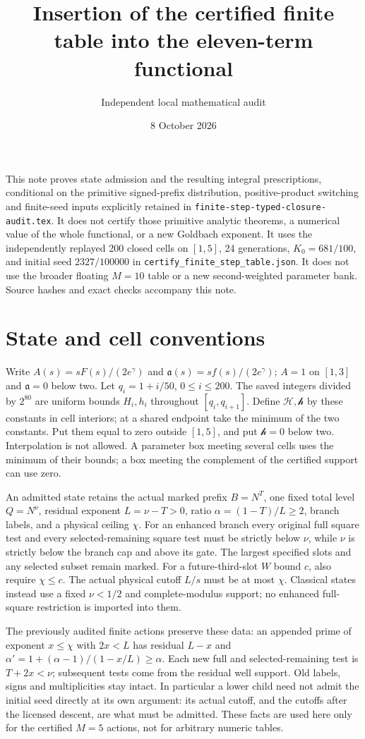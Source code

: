 \documentclass[11pt]{article}
\title{Insertion of the certified finite table into the eleven-term functional}
\author{Independent local mathematical audit}
\date{8 October 2026}
\newcommand{\HH}{\mathcal H}
\newcommand{\hh}{\mathcal h}
\newcommand{\alow}{\mathfrak a}
\begin{document}
\maketitle

This note proves state admission and the resulting integral prescriptions,
conditional on the primitive signed-prefix distribution, positive-product
switching and finite-seed inputs explicitly retained in
\texttt{finite-step-typed-closure-audit.tex}. It does not certify those
primitive analytic theorems, a numerical value of the whole functional,
or a new Goldbach exponent. It uses the independently replayed 200 closed
cells on $[1,5]$, 24 generations, $K_0=681/100$, and initial seed
$2327/100000$ in \texttt{certify\_finite\_step\_table.json}.
It does not use the broader floating $M=10$ table or a new second-weighted
parameter bank. Source hashes and exact checks accompany this note.

\section*{State and cell conventions}
Write $A(s)=sF(s)/(2e^\gamma)$ and $\alow(s)=sf(s)/(2e^\gamma)$;
$A=1$ on $[1,3]$ and $\alow=0$ below two. Let $q_i=1+i/50$,
$0\le i\le200$. The saved integers divided by $2^{80}$ are
uniform bounds $H_i,h_i$ throughout $[q_i,q_{i+1}]$.
Define $\HH,\hh$ by these constants in cell interiors; at a shared
endpoint take the minimum of the two constants. Put them equal to zero
outside $[1,5]$, and put $\hh=0$ below two. Interpolation is not allowed.
A parameter box meeting several cells uses the minimum of their bounds;
a box meeting the complement of the certified support can use zero.

An admitted state retains the actual marked prefix $B=N^T$, one fixed
total level $Q=N^\nu$, residual exponent $L=\nu-T>0$, ratio
$\alpha=(1-T)/L\ge2$, branch labels, and a physical ceiling $\chi$.
For an enhanced branch every original full square test and every
selected-remaining square test must be strictly below $\nu$, while
$\nu$ is strictly below the branch cap and above its gate.
The largest specified slots and any selected subset remain marked.
For a future-third-slot $W$ bound $c$, also require $\chi\le c$.
The actual physical cutoff $L/s$ must be at most $\chi$.
Classical states instead use a fixed $\nu<1/2$ and complete-modulus
support; no enhanced full-square restriction is imported into them.

The previously audited finite actions preserve these data: an appended
prime of exponent $x\le\chi$ with $2x<L$ has residual $L-x$ and
$\alpha'=1+(\alpha-1)/(1-x/L)\ge\alpha$. Each new full and
selected-remaining test is $T+2x<\nu$; subsequent tests come from the
residual well support. Old labels, signs and multiplicities stay intact.
In particular a lower child need not admit the initial seed directly
at its own argument: its actual cutoff, and the cutoffs after the
licensed descent, are what must be admitted. These facts are used here
only for the certified $M=5$ actions, not for arbitrary numeric tables.
\end{document}
